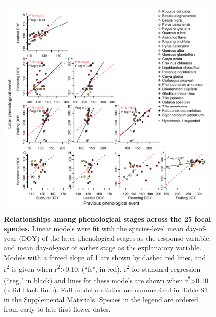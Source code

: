 \documentclass{article}
\begin{document}
 \begin{figure}[h]
 \centering
 \includegraphics{../analyses/figures/Hyp1_forcedslope_samerange2.pdf}
 \caption{\textbf{Relationships among phenological stages across the 25 focal species.} Linear models were fit with the species-level mean day-of-year (DOY) of the later phenological stages as the response variable, and mean day-of-year of earlier stage as the explanatory variable. Models with a forced slope of 1 are shown by dashed red lines, and r\textsuperscript{2} is given when r\textsuperscript{2}>0.10. (``fs", in red). r\textsuperscript{2} for standard regression (``reg," in black) and lines for these models are shown when r\textsuperscript{2}>0.10 (solid black lines). Full model statistics are summarized in Table S1 in the Supplemental Materials. Species in the legend are ordered from early to late first-flower dates.} 
 \label{fig:latevearly}
\end{figure}
\end{document}
